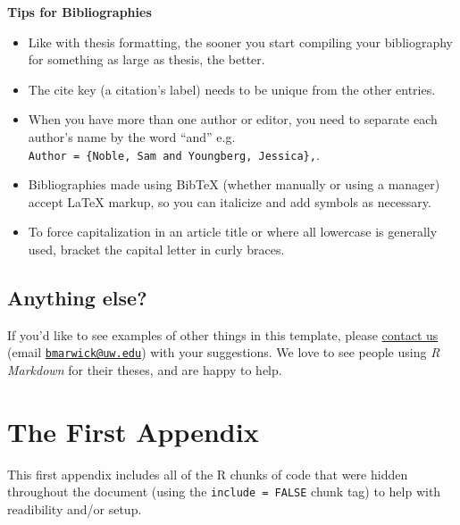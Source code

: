 \documentclass[twoside,12pt,final]{ucthesis-CA2012} %
\providecommand{\tightlist}{%
  \setlength{\itemsep}{0pt}\setlength{\parskip}{0pt}}
\begin{document}
\begin{ucmainmatter}
\textbf{Tips for Bibliographies}
\begin{itemize}
\tightlist
\item
  Like with thesis formatting, the sooner you start compiling your
  bibliography for something as large as thesis, the better.
\item
  The cite key (a citation's label) needs to be unique from the other
  entries.
\item
  When you have more than one author or editor, you need to separate
  each author's name by the word ``and'' e.g.
  \texttt{Author\ =\ \{Noble,\ Sam\ and\ Youngberg,\ Jessica\},}.
\item
  Bibliographies made using BibTeX (whether manually or using a manager)
  accept LaTeX markup, so you can italicize and add symbols as
  necessary.
\item
  To force capitalization in an article title or where all lowercase is
  generally used, bracket the capital letter in curly braces.
\end{itemize}
\hypertarget{anything-else}{%
\section{Anything else?}\label{anything-else}}

If you'd like to see examples of other things in this template, please
\href{https://github.com/benmarwick/huskydown/issues/new}{contact us}
(email \href{mailto:bmarwick@uw.edu}{\nolinkurl{bmarwick@uw.edu}}) with
your suggestions. We love to see people using \emph{R Markdown} for
their theses, and are happy to help.

\appendix

\hypertarget{the-first-appendix}{%
\chapter{The First Appendix}\label{the-first-appendix}}

This first appendix includes all of the R chunks of code that were
hidden throughout the document (using the \texttt{include\ =\ FALSE}
chunk tag) to help with readibility and/or setup.


\end{ucmainmatter}
\end{document}
